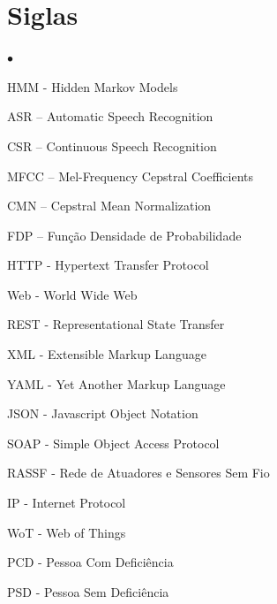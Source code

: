 \documentclass[12pt,a4paper,oneside]{report}
\author{Bruno Lima Cardoso}
\begin{document}


\chapter*{Siglas}
\begin{list}{$\bullet$}{}
  \item[] HMM - Hidden Markov Models
  \item[] ASR – Automatic Speech Recognition
  \item[] CSR – Continuous Speech Recognition
  \item[] MFCC – Mel-Frequency Cepstral Coefficients
  \item[] CMN – Cepstral Mean Normalization
  \item[] FDP – Função Densidade de Probabilidade
  \item[] HTTP - Hypertext Transfer Protocol
  \item[] Web - World Wide Web
  \item[] REST - Representational State Transfer
  \item[] XML - Extensible Markup Language
  \item[] YAML - Yet Another Markup Language
  \item[] JSON - Javascript Object Notation
  \item[] SOAP - Simple Object Access Protocol
  \item[] RASSF - Rede de Atuadores e Sensores Sem Fio
  \item[] IP - Internet Protocol
  \item[] WoT - Web of Things
  \item[] PCD - Pessoa Com Deficiência
  \item[] PSD - Pessoa Sem Deficiência
\end{list}
\end{document}
